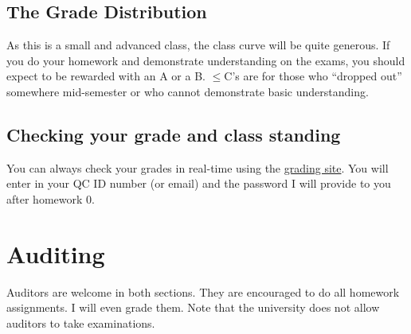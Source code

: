\documentclass[12pt]{article}
\newcommand{\qu}[1]{``#1''}
\begin{document}
\subsection*{The Grade Distribution}

As this is a small and advanced class, the class curve will be quite generous. If you do your homework and demonstrate understanding on the exams, you should expect to be rewarded with an A or a B. $\leq$C's are for those who \qu{dropped out} somewhere mid-semester or who cannot demonstrate basic understanding.

\subsection*{Checking your grade and class standing}

You can always check your grades in real-time using the \href{http://gradesly.com}{grading site}. You will enter in your QC ID number (or email) and the password I will provide to you after homework 0.



\section*{Auditing}

Auditors are welcome in both sections. They are encouraged to do all homework assignments. I will even grade them. Note that the university does not allow auditors to take examinations.
\end{document}

